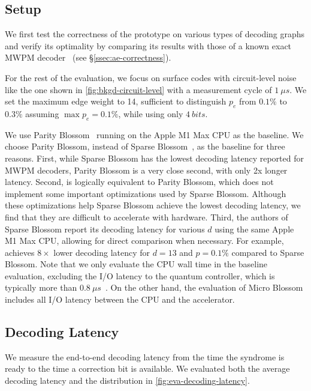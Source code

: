 \subsection{Setup}
\label{ssec:eval-setup}
We first test the correctness of the prototype on various types of decoding graphs and verify its optimality by comparing its results with those of a known exact MWPM decoder~\cite{wu2023qce} (see \S\ref{ssec:ae-correctness}).

For the rest of the evaluation, we focus on surface codes with circuit-level noise like the one shown in \autoref{fig:bkgd-circuit-level} with a measurement cycle of $\qty{1}{\mu s}$.
We set the maximum edge weight to 14, sufficient to distinguish $p_e$ from $0.1\%$ to $0.3\%$ assuming $\max p_e = 0.1\%$, while using only $\qty{4}{bits}$.

We use Parity Blossom~\cite{wu2023qce} running on the Apple M1 Max CPU as the baseline.
We choose Parity Blossom, instead of Sparse Blossom~\cite{higgott2025sparse}, as the baseline for three reasons. 
First, while Sparse Blossom has the lowest decoding latency reported for MWPM decoders, Parity Blossom is a very close second, with only 2x longer latency. 
Second, \system is logically equivalent to Parity Blossom, which does not implement some important optimizations used by Sparse Blossom. Although these optimizations help Sparse Blossom achieve the lowest decoding latency, we find that they are difficult to accelerate with hardware. 
Third, the authors of Sparse Blossom report its decoding latency for various $d$ using the same Apple M1 Max CPU, allowing for direct comparison when necessary. For example, \system achieves $8\times$ lower decoding latency for $d=13$ and $p=0.1\%$ compared to Sparse Blossom.
Note that we only evaluate the CPU wall time in the baseline evaluation, excluding the I/O latency to the quantum controller, which is typically more than $\qty{0.8}{\mu s}$~\cite{neugebauer2018understanding,apple-thunderbolt-latency}.
On the other hand, the evaluation of Micro Blossom includes all I/O latency between the CPU and the accelerator.

\subsection{Decoding Latency}\label{ssec:eva-decoding-latency}

We measure the end-to-end decoding latency from the time the syndrome is ready to the time a correction bit is available.
We evaluated both the average decoding latency and the distribution in \autoref{fig:eva-decoding-latency}.

